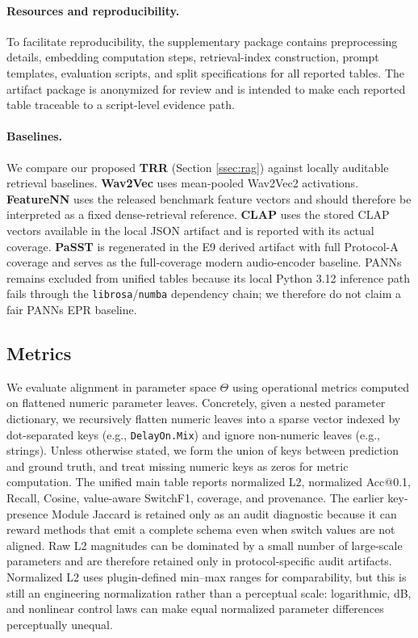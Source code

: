 \paragraph{Resources and reproducibility.}
\label{sec:repro}
To facilitate reproducibility, the supplementary package contains preprocessing details, embedding computation steps, retrieval-index construction, prompt templates, evaluation scripts, and split specifications for all reported tables. The artifact package is anonymized for review and is intended to make each reported table traceable to a script-level evidence path.

\paragraph{Baselines.}
We compare our proposed \textbf{TRR} (Section \ref{ssec:rag}) against locally auditable retrieval baselines. \textbf{Wav2Vec} uses mean-pooled Wav2Vec2 activations. \textbf{FeatureNN} uses the released benchmark feature vectors and should therefore be interpreted as a fixed dense-retrieval reference. \textbf{CLAP} uses the stored CLAP vectors available in the local JSON artifact and is reported with its actual coverage. \textbf{PaSST} is regenerated in the E9 derived artifact with full Protocol-A coverage and serves as the full-coverage modern audio-encoder baseline. PANNs remains excluded from unified tables because its local Python 3.12 inference path fails through the \texttt{librosa}/\texttt{numba} dependency chain; we therefore do not claim a fair PANNs EPR baseline.

\subsection{Metrics}
\label{ssec:metrics}
We evaluate alignment in parameter space $\Theta$ using operational metrics computed on flattened numeric parameter leaves. Concretely, given a nested parameter dictionary, we recursively flatten numeric leaves into a sparse vector indexed by dot-separated keys (e.g., \texttt{DelayOn.Mix}) and ignore non-numeric leaves (e.g., strings). Unless otherwise stated, we form the union of keys between prediction and ground truth, and treat missing numeric keys as zeros for metric computation. The unified main table reports normalized L2, normalized Acc@0.1, Recall, Cosine, value-aware SwitchF1, coverage, and provenance. The earlier key-presence Module Jaccard is retained only as an audit diagnostic because it can reward methods that emit a complete schema even when switch values are not aligned. Raw L2 magnitudes can be dominated by a small number of large-scale parameters and are therefore retained only in protocol-specific audit artifacts. Normalized L2 uses plugin-defined min--max ranges for comparability, but this is still an engineering normalization rather than a perceptual scale: logarithmic, dB, and nonlinear control laws can make equal normalized parameter differences perceptually unequal.

